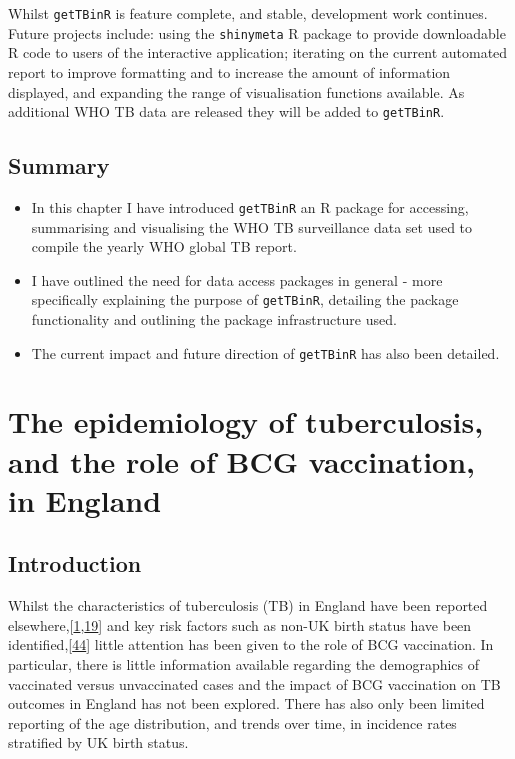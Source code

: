 \documentclass[11pt,twoside]{bristolthesis}
\begin{document}
  Whilst \texttt{getTBinR} is feature complete, and stable, development work continues. Future projects include: using the \texttt{shinymeta} R package to provide downloadable R code to users of the interactive application; iterating on the current automated report to improve formatting and to increase the amount of information displayed, and expanding the range of visualisation functions available. As additional WHO TB data are released they will be added to \texttt{getTBinR}.
  
  \hypertarget{summary-2}{%
  \section{Summary}\label{summary-2}}
  \begin{itemize}
  \item
    In this chapter I have introduced \texttt{getTBinR} an R package for accessing, summarising and visualising the WHO TB surveillance data set used to compile the yearly WHO global TB report.
  \item
    I have outlined the need for data access packages in general - more specifically explaining the purpose of \texttt{getTBinR}, detailing the package functionality and outlining the package infrastructure used.
  \item
    The current impact and future direction of \texttt{getTBinR} has also been detailed.
  \end{itemize}
  \hypertarget{data}{%
  \chapter{The epidemiology of tuberculosis, and the role of BCG vaccination, in England}\label{data}}
  
  \hypertarget{introduction-2}{%
  \section{Introduction}\label{introduction-2}}
  
  Whilst the characteristics of tuberculosis (TB) in England have been reported elsewhere,{[}\protect\hyperlink{ref-PHE2017}{1},\protect\hyperlink{ref-PHE2018}{19}{]} and key risk factors such as non-UK birth status have been identified,{[}\protect\hyperlink{ref-French2007}{44}{]} little attention has been given to the role of BCG vaccination. In particular, there is little information available regarding the demographics of vaccinated versus unvaccinated cases and the impact of BCG vaccination on TB outcomes in England has not been explored. There has also only been limited reporting of the age distribution, and trends over time, in incidence rates stratified by UK birth status.
  
\end{document}
